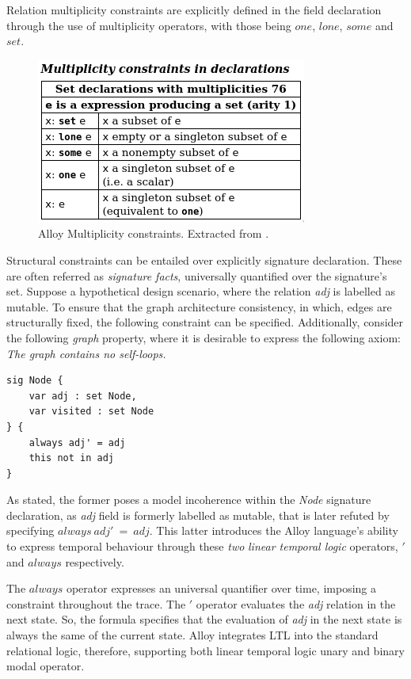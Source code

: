 Relation multiplicity constraints are explicitly defined in the field declaration through the use of multiplicity operators, with those being $one$, $lone$, $some$ and $set$.

\begin{figure}[H]
    \centering
    \includegraphics[width=0.4\linewidth]{images/alloy_multiplicity.png}
    \caption{Alloy Multiplicity constraints. Extracted from \cite{alloy-qr}.} 
    \label{fig:alloy-multiplicity}
\end{figure}


Structural constraints can be entailed over explicitly signature declaration. These are often referred as \textit{signature facts}, universally quantified over the signature's set. \cite{alloy-qr} Suppose a hypothetical design scenario, where the relation \textit{adj} is labelled as mutable. To ensure that the graph architecture consistency, in which, edges are structurally fixed, the following constraint can be specified. Additionally, consider the following \textit{graph} property, where it is desirable to express the following axiom: \textit{The graph contains no self-loops.}

\begin{lstlisting}[title={\textit{Node} hypothetical constraints over the signature definition.}, otherkeywords = {abstract, sig, module, var, set, fact, extends, no, in, this, not, always, \', \=}, floatplacement=H]
sig Node {
    var adj : set Node, 
    var visited : set Node
} {
    always adj' = adj
    this not in adj
}
\end{lstlisting}

As stated, the former poses a model incoherence within the \textit{Node} signature declaration, as \textit{adj} field is formerly labelled as mutable, that is later refuted by specifying $always \ adj'\ =\ adj$. This latter introduces the Alloy language's ability to express temporal behaviour through these \textit{two} \textit{linear temporal logic} operators, $'$ and $always$ respectively. 

The $always$ operator expresses an universal quantifier over time, imposing a constraint throughout the trace. The $'$ operator evaluates the \textit{adj} relation in the next state. So, the formula specifies that the evaluation of \textit{adj} in the next state is always the same of the current state. Alloy integrates LTL into the standard relational logic, therefore, supporting both linear temporal logic unary and binary modal operator.

